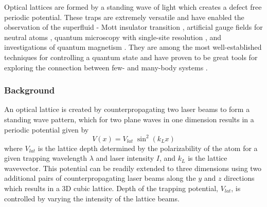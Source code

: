 Optical lattices are formed by a standing wave of light which creates a defect free periodic potential.
These traps are extremely versatile and have enabled the observation of the superfluid - Mott insulator transition \cite{Greiner2002}, artificial gauge fields for neutral atoms \cite{Lin2011}, quantum microscopy with single-site resolution \cite{Bakr2009}, and investigations of quantum magnetism \cite{Hart2015,Greif2015}. 
They are among the most well-established techniques for controlling a quantum state and have proven to be great tools for exploring the connection between few- and many-body systems \cite{Bloch2008}.

\subsubsection{Background} \label{sec:latBackground}
An optical lattice is created by counterpropagating two laser beams to form a standing wave pattern, which for two plane waves in one dimension results in a periodic potential given by 
	\begin{equation}
		 V(x) = V_{lat} \; \sin^2(k_L x)
	\end{equation}
where $V_{lat}$ is the lattice depth determined by the polarizability of the atom for a given trapping wavelength $\lambda$ and laser intensity $I$, and $k_L$ is the lattice wavevector.
This potential can be readily extended to three dimensions using two additional pairs of counterpropagating laser beams along the $y$ and $z$ directions which results in a 3D cubic lattice.
Depth of the trapping potential, $V_{lat}$, is controlled by varying the intensity of the lattice beams.

